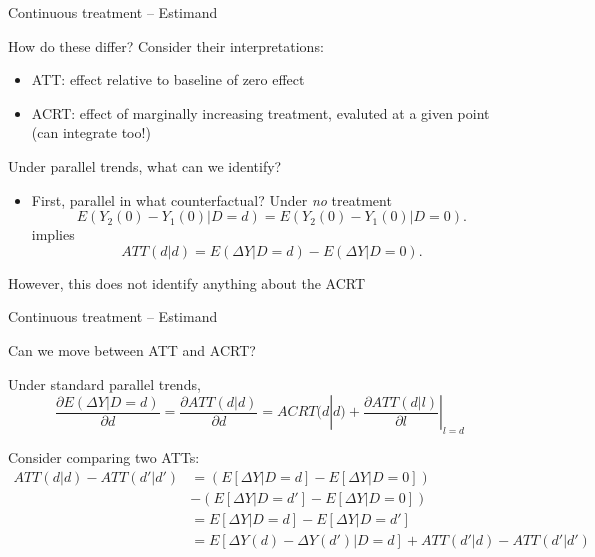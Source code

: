 \documentclass[notes,11pt, aspectratio=169]{beamer}
\newenvironment{wideitemize}{\itemize\addtolength{\itemsep}{10pt}}{\enditemize}
\begin{document}
\begin{frame}{Continuous treatment -- Estimand}
  \begin{wideitemize}
  \item How do these differ? Consider their interpretations:
    \begin{itemize}
    \item ATT: effect relative to baseline of zero effect
    \item ACRT: effect of marginally increasing treatment, evaluted at a given point (can integrate too!)
    \end{itemize}
    \item Under parallel trends, what can we identify?
    \begin{itemize}
      \item First, parallel in what counterfactual? Under \emph{no} treatment
\begin{equation}
  E(Y_{2}(0) - Y_{1}(0) | D = d) = E(Y_{2}(0) - Y_{1}(0) | D = 0).
\end{equation}
implies
\begin{equation}
  ATT(d|d) = E(\Delta Y  | D = d) - E(\Delta Y | D = 0).
\end{equation}
    \end{itemize} 
\item However, this does not identify anything about the ACRT

  \end{wideitemize}
\end{frame}

\begin{frame}{Continuous treatment -- Estimand}
  \begin{wideitemize}
    \item Can we move between ATT and ACRT?
    \item Under standard parallel trends, 
    \begin{equation}
      \frac{\partial E(\Delta Y | D = d)}{\partial d} = \frac{\partial ATT(d|d)}{\partial d} = ACRT(d|d) + \frac{\partial ATT(d|l)}{\partial l}|_{l=d}
    \end{equation}
  \item Consider comparing two ATTs:
    \begin{align*}
      ATT(d | d) -  ATT(d' | d') &= \left(E[\Delta Y | D = d]  - E[\Delta Y | D=0]\right)\\
                                 &- \left(E[\Delta Y | D = d']  - E[\Delta Y | D=0]\right)\\
                                 &= E[\Delta Y | D = d]  - E[\Delta Y | D = d']\\
                                 &= E[\Delta Y(d) - \Delta Y(d') | D = d]  + ATT(d' | d) - ATT(d' | d')
    \end{align*}
  \end{wideitemize}
\end{frame}
\end{document}
